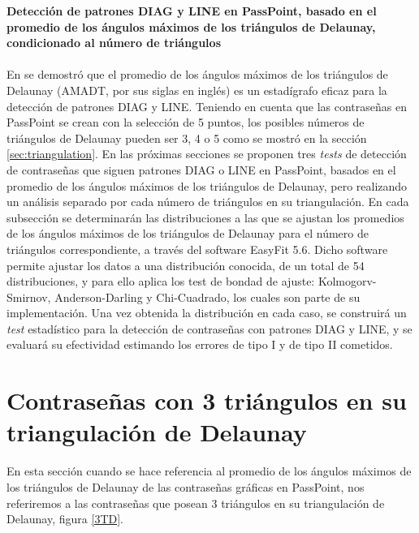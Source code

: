 \documentclass[12pt]{report}
\begin{document}
\vspace{-2em} %

\noindent\textbf{\LARGE Detección de patrones DIAG y LINE en PassPoint, basado en el promedio de los ángulos máximos de los triángulos de Delaunay, condicionado al número de triángulos}\\
\vspace{2em}
\\	
En \cite{13} se demostró que el promedio de los ángulos máximos de los triángulos de Delaunay (AMADT, por sus siglas en inglés) es un estadígrafo eficaz para la detección de patrones DIAG y LINE. Teniendo en cuenta que las contraseñas en PassPoint se crean con la selección de 5 puntos, los posibles números de triángulos de Delaunay pueden ser 3, 4 o 5 como se mostró en la sección \ref{sec:triangulation}. En las próximas secciones se proponen tres \textit{tests} de detección de contraseñas  que siguen patrones DIAG o LINE en PassPoint, basados en el promedio de los ángulos  máximos de los triángulos de Delaunay, pero  realizando un análisis separado por cada número de triángulos en su triangulación.
En cada subsección se determinarán las distribuciones a las que se ajustan los promedios de los ángulos máximos de los triángulos de Delaunay para el número de triángulos correspondiente, a través  del software EasyFit 5.6. Dicho software permite ajustar los datos a una distribución conocida, de un total de 54 distribuciones, y para ello aplica los test de bondad de ajuste: Kolmogorv-Smirnov, Anderson-Darling y Chi-Cuadrado, los cuales son parte de su implementación. 
Una vez obtenida la distribución en cada caso, se construirá un \textit{test} estadístico para la detección de contraseñas con patrones DIAG y LINE, y se evaluará su efectividad estimando los errores de  tipo I y de tipo II cometidos.



\setcounter{section}{0}
\section{Contraseñas con 3 triángulos en su triangulación de Delaunay }
\label{sec:1}
En esta sección cuando se hace referencia  al promedio de los ángulos máximos de los triángulos de Delaunay  de las contraseñas gráficas en PassPoint, nos referiremos a las contraseñas que posean 3 triángulos en su triangulación de Delaunay, figura \ref{3TD}.
\newpage
	
\end{document}
